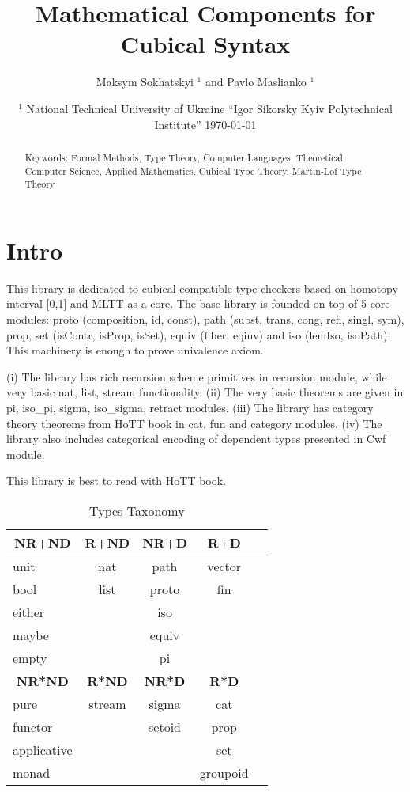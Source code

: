 \documentclass{article}
\newcommand*{\thead}[1]{\multicolumn{1}{c}{\bfseries #1}}
\begin{document}
\title{Mathematical Components for Cubical Syntax}
\author{Maksym Sokhatskyi $^1$ and Pavlo Maslianko $^1$}
\date{
    $^1$ National Technical University of Ukraine ``Igor Sikorsky Kyiv Polytechnical Institute''
    \today
}

\maketitle

\begin{abstract}
Keywords: Formal Methods, Type Theory, Computer Languages,
          Theoretical Computer Science, Applied Mathematics,
          Cubical Type Theory, Martin-Löf Type Theory
\end{abstract}

\tableofcontents

\section{Intro}

This library is dedicated to cubical-compatible type checkers \cite{Mortberg17} based
on homotopy interval [0,1] and MLTT as a core. The base library is
founded on top of 5 core modules: proto (composition, id, const),
path (subst, trans, cong, refl, singl, sym), prop, set (isContr, isProp, isSet),
equiv (fiber, eqiuv) and iso (lemIso, isoPath).
This machinery is enough to prove univalence axiom.

(i) The library has rich recursion scheme primitives
in recursion module, while very basic nat, list, stream
functionality. (ii) The very basic theorems are given
in pi, iso\_pi, sigma, iso\_sigma, retract modules.
(iii) The library has category theory theorems from
HoTT book in cat, fun and category modules.
(iv) The library also includes categorical encoding
of dependent types presented in Cwf module.

This library is best to read with HoTT book.

\begin{table}[h]
\centering
\caption{Types Taxonomy}
\label{tab:a}
\begin{tabular}{lcccc}
\hline
\thead{NR+ND} & \thead{R+ND} & \thead{NR+D} & \thead{R+D}\\
\hline
unit        & nat    & path    & vector \\
bool        & list   & proto   & fin \\
either      &        & iso     &  \\
maybe       &        & equiv   &  \\
empty       &        & pi       &  \\
\hline
\thead{NR*ND} & \thead{R*ND} & \thead{NR*D} & \thead{R*D}\\
\hline
pure        & stream & sigma   & cat  \\
functor     &        & setoid  & prop \\
applicative &        &         & set  \\
monad       &        &         & groupoid \\
\end{tabular}
\end{table}
\end{document}
